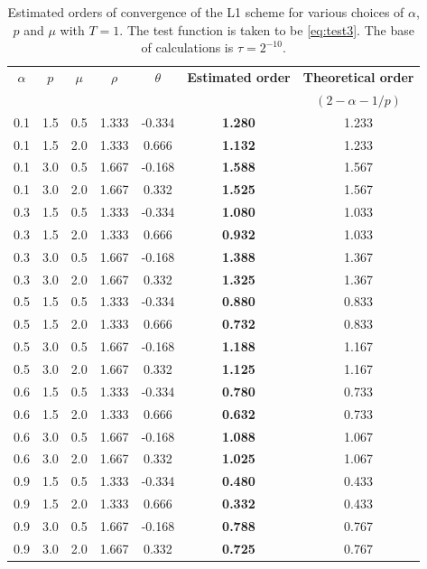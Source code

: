 \documentclass[12pt,a4paper]{article}
\theoremstyle{definition}
\begin{document}
\begin{table}[h]
\centering
\begin{tabular}{ccccccc}
\hline
$\alpha$ & $p$ & $\mu$ & $\rho$ & $\theta$ & \textbf{Estimated order} & \textbf{Theoretical order} \\
 & & & &  &  & $(2 - \alpha - 1/p)$ \\
\hline
0.1 & 1.5 & 0.5 & 1.333 & -0.334 & \textbf{1.280} & 1.233 \\
0.1 & 1.5 & 2.0 & 1.333 & 0.666 & \textbf{1.132} & 1.233 \\
0.1 & 3.0 & 0.5 & 1.667 & -0.168 & \textbf{1.588} & 1.567 \\
0.1 & 3.0 & 2.0 & 1.667 & 0.332 & \textbf{1.525} & 1.567 \\
\hline
0.3 & 1.5 & 0.5 & 1.333 & -0.334 & \textbf{1.080} & 1.033 \\
0.3 & 1.5 & 2.0 & 1.333 & 0.666 & \textbf{0.932} & 1.033 \\
0.3 & 3.0 & 0.5 & 1.667 & -0.168 & \textbf{1.388} & 1.367 \\
0.3 & 3.0 & 2.0 & 1.667 & 0.332 & \textbf{1.325} & 1.367 \\
\hline
0.5 & 1.5 & 0.5 & 1.333 & -0.334 & \textbf{0.880} & 0.833 \\
0.5 & 1.5 & 2.0 & 1.333 & 0.666 & \textbf{0.732} & 0.833 \\
0.5 & 3.0 & 0.5 & 1.667 & -0.168 & \textbf{1.188} & 1.167 \\
0.5 & 3.0 & 2.0 & 1.667 & 0.332 & \textbf{1.125} & 1.167 \\
\hline
0.6 & 1.5 & 0.5 & 1.333 & -0.334 & \textbf{0.780} & 0.733 \\
0.6 & 1.5 & 2.0 & 1.333 & 0.666 & \textbf{0.632} & 0.733 \\
0.6 & 3.0 & 0.5 & 1.667 & -0.168 & \textbf{1.088} & 1.067 \\
0.6 & 3.0 & 2.0 & 1.667 & 0.332 & \textbf{1.025} & 1.067 \\
\hline
0.9 & 1.5 & 0.5 & 1.333 & -0.334 & \textbf{0.480} & 0.433 \\
0.9 & 1.5 & 2.0 & 1.333 & 0.666 & \textbf{0.332} & 0.433 \\
0.9 & 3.0 & 0.5 & 1.667 & -0.168 & \textbf{0.788} & 0.767 \\
0.9 & 3.0 & 2.0 & 1.667 & 0.332 & \textbf{0.725} & 0.767 \\
\hline
\end{tabular}
\caption{Estimated orders of convergence of the L1 scheme for various choices of $\alpha$, $p$ and $\mu$ with $T = 1$. The test function is taken to be \eqref{eq:test3}. The base of calculations is $\tau = 2^{-10}$.}
\label{tab:tab3}
\end{table}
\end{document}

